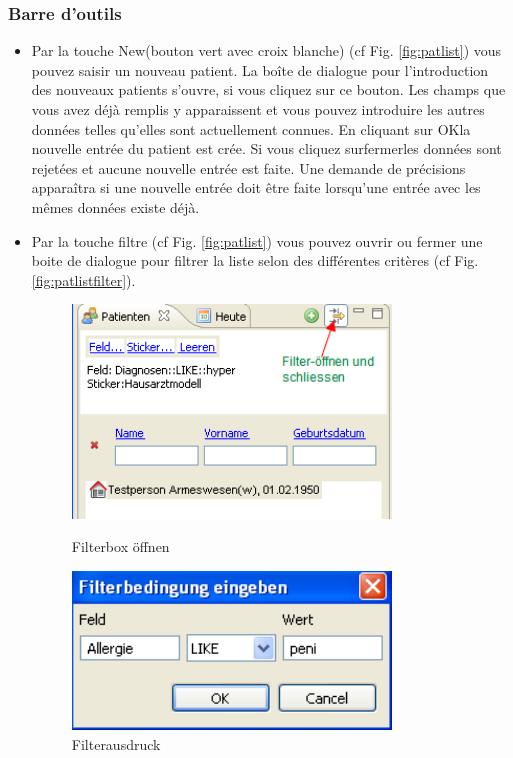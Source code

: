 \subsubsection{Barre d'outils}
\begin{itemize}
  \item Par la touche  \glqq New\grqq{}(bouton vert avec croix blanche)  (cf Fig. \ref{fig:patlist}) vous pouvez saisir un nouveau patient. La boîte de dialogue pour l'introduction des nouveaux patients s'ouvre, si vous cliquez sur ce bouton. Les champs que vous avez déjà remplis y apparaissent et vous pouvez introduire les autres données telles qu'elles sont actuellement connues. En cliquant sur \glqq OK\grqq{}la nouvelle entrée du patient est crée. Si vous cliquez sur\glqq fermer\grqq{}les données sont rejetées et aucune nouvelle entrée est faite. Une demande de précisions apparaîtra si une nouvelle entrée doit être faite lorsqu'une entrée avec les mêmes données existe déjà.



  \item Par la touche  \glqq filtre\grqq{} (cf Fig. \ref{fig:patlist}) vous pouvez ouvrir ou fermer une boite de dialogue pour filtrer la liste selon des différentes critères (cf  Fig. \ref{fig:patlistfilter}).
	\begin{figure}[ht]
        \begin{minipage}{0.5\textwidth}
        \centering
    	\includegraphics[width=0.8\textwidth]{images/patlistfilter}
    	\caption{Filterbox öffnen}
    	\label{fig:patlistfilter}
        \end{minipage}\hfill
        \begin{minipage}{0.5\textwidth}
        \centering
        \includegraphics[width=0.8\textwidth]{images/patlistfilter2}
        \caption{Filterausdruck}\label{fig:filterexpr}
        \end{minipage}
    \end{figure}
\end{itemize}

